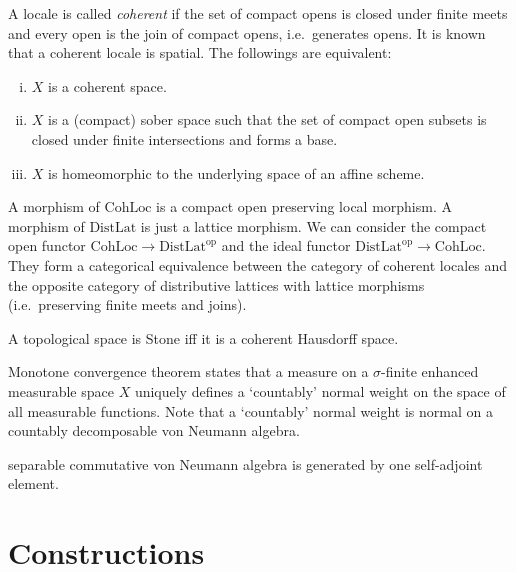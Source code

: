 \documentclass{../../large}
\begin{document}
\begin{prb}
\end{prb}


\begin{prb}
A locale is called \emph{coherent} if the set of compact opens is closed under finite meets and every open is the join of compact opens, i.e.~generates opens.
It is known that a coherent locale is spatial.
The followings are equivalent:
\begin{enumerate}[(i)]
\item $X$ is a coherent space.
\item $X$ is a (compact) sober space such that the set of compact open subsets is closed under finite intersections and forms a base.
\item $X$ is homeomorphic to the underlying space of an affine scheme.
\end{enumerate}
A morphism of $\mathrm{CohLoc}$ is a compact open preserving local morphism.
A morphism of $\mathrm{DistLat}$ is just a lattice morphism.
We can consider the compact open functor $\mathrm{CohLoc}\to\mathrm{DistLat}^{\mathrm{op}}$ and the ideal functor $\mathrm{DistLat}^{\mathrm{op}}\to\mathrm{CohLoc}$.
They form a categorical equivalence between the category of coherent locales and the opposite category of distributive lattices with lattice morphisms (i.e.~preserving finite meets and joins).

A topological space is Stone iff it is a coherent Hausdorff space.
\end{prb}









Monotone convergence theorem states that a measure on a $\sigma$-finite enhanced measurable space $X$ uniquely defines a `countably' normal weight on the space of all measurable functions.
Note that a `countably' normal weight is normal on a countably decomposable von Neumann algebra.


separable commutative von Neumann algebra is generated by one self-adjoint element.













\part{Constructions}
\end{document}
